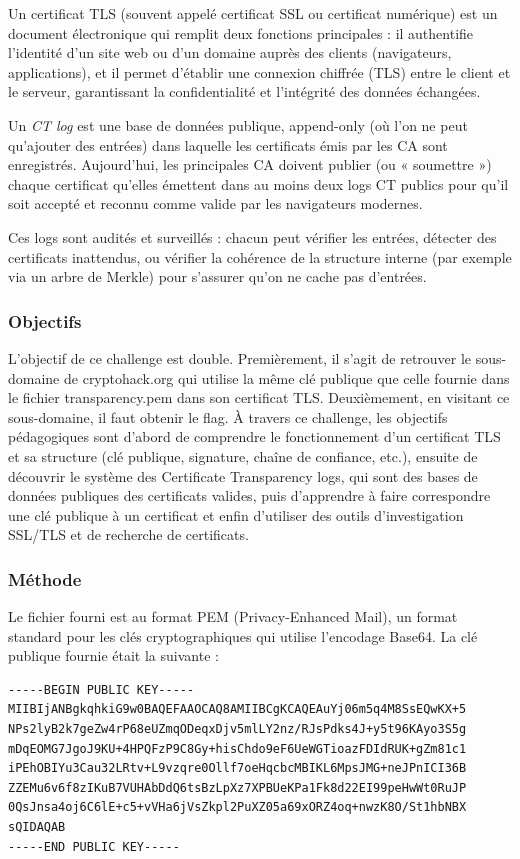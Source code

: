 Un certificat TLS (souvent appelé certificat SSL ou certificat numérique)
est un document électronique qui remplit deux fonctions principales : il
authentifie l'identité d'un site web ou d'un domaine auprès des clients
(navigateurs, applications), et il permet d'établir une connexion
chiffrée (TLS) entre le client et le serveur, garantissant la
confidentialité et l'intégrité des données échangées.

Un \emph{CT log} est une base de données publique, append-only (où l'on ne
peut qu'ajouter des entrées) dans laquelle les certificats émis par les CA
sont enregistrés. Aujourd'hui, les principales CA doivent publier (ou
« soumettre ») chaque certificat qu'elles émettent dans au moins deux
logs CT publics pour qu'il soit accepté et reconnu comme valide par les
navigateurs modernes.

Ces logs sont audités et surveillés : chacun peut vérifier les entrées,
détecter des certificats inattendus, ou vérifier la cohérence de la
structure interne (par exemple via un arbre de Merkle) pour s'assurer
qu'on ne cache pas d'entrées.

\subsubsection{Objectifs}
L'objectif de ce challenge est double. Premièrement, il s'agit de
retrouver le sous-domaine de cryptohack.org qui utilise la même clé
publique que celle fournie dans le fichier transparency.pem dans son
certificat TLS. Deuxièmement, en visitant ce sous-domaine, il faut
obtenir le flag. À travers ce challenge, les objectifs pédagogiques sont
d'abord de comprendre le fonctionnement d’un certificat TLS et sa
structure (clé publique, signature, chaîne de confiance, etc.), ensuite
de découvrir le système des Certificate Transparency logs, qui sont des
bases de données publiques des certificats valides, puis d'apprendre à
faire correspondre une clé publique à un certificat et enfin d'utiliser
des outils d’investigation SSL/TLS et de recherche de certificats.

\subsubsection{Méthode}
Le fichier fourni est au format PEM (Privacy-Enhanced Mail), un format
standard pour les clés cryptographiques qui utilise l'encodage Base64.
La clé publique fournie était la suivante :

\begin{verbatim}
-----BEGIN PUBLIC KEY-----
MIIBIjANBgkqhkiG9w0BAQEFAAOCAQ8AMIIBCgKCAQEAuYj06m5q4M8SsEQwKX+5
NPs2lyB2k7geZw4rP68eUZmqODeqxDjv5mlLY2nz/RJsPdks4J+y5t96KAyo3S5g
mDqEOMG7JgoJ9KU+4HPQFzP9C8Gy+hisChdo9eF6UeWGTioazFDIdRUK+gZm81c1
iPEhOBIYu3Cau32LRtv+L9vzqre0Ollf7oeHqcbcMBIKL6MpsJMG+neJPnICI36B
ZZEMu6v6f8zIKuB7VUHAbDdQ6tsBzLpXz7XPBUeKPa1Fk8d22EI99peHwWt0RuJP
0QsJnsa4oj6C6lE+c5+vVHa6jVsZkpl2PuXZ05a69xORZ4oq+nwzK8O/St1hbNBX
sQIDAQAB
-----END PUBLIC KEY-----
\end{verbatim}


